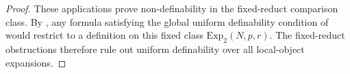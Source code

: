 \begin{proof}
These applications prove non-definability in the fixed-reduct comparison class. By , any formula satisfying the global uniform definability condition of  would restrict to a definition on this fixed class $\mathrm{Exp}_2(N,p,r)$. The fixed-reduct obstructions therefore rule out uniform definability over all local-object expansions.
\end{proof}
